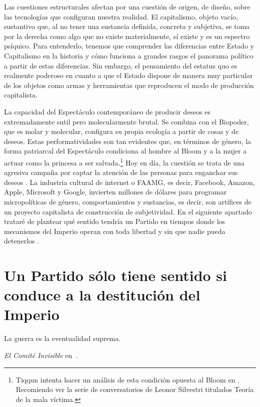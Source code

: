 Las cuestiones estructurales afectan por una cuestión de origen, de diseño, sobre las tecnologías que configuran nuestra realidad. El capitalismo, objeto vacío, sustantivo que, al no tener una sustancia definida, concreta y subjetiva, se toma por la derecha como algo que no existe materialmente, sí existe y es un espectro psíquico. Para entenderlo, tenemos que comprender las diferencias entre Estado y Capitalismo en la historia y cómo funciona a grandes rasgos el panorama político a partir de estas diferencias. Sin embargo, el pensamiento del estatus quo es realmente poderoso en cuanto a que el Estado dispone de manera muy particular de los objetos como armas y herramientas que reproducen el modo de producción capitalista.

La capacidad del Espectáculo contemporáneo de producir deseos es extremadamente sutil pero molecularmente brutal. Se combina con el Biopoder, que es molar y molecular, configura su propia ecología a partir de cosas y de deseos. Estas performatividades son tan evidentes que, en términos de género, la forma patriarcal del Espectáculo condiciona al hombre al Bloom y a la mujer a actuar como la princesa a ser salvada.\footnote{Tiqqun intenta hacer un análisis de esta condición opuesta al Bloom en \autocite{PrimerosMaterialesPara}. Recomiendo ver la serie de conversatorios de Leonor Silvestri titulados Teoría de la mala víctima.} Hoy en día, la cuestión se trata de una agresiva campaña por captar la atención de las personas para enganchar sus deseos \autocite{fernandez-savaterAusentarseCrisisAtencion, lanhamEconomicsAttentionStyle2007}. La industria cultural de internet o FAAMG, es decir, Facebook, Amazon, Apple, Microsoft y Google, invierten millones de dólares para programar micropolíticas de género, comportamientos y sustancias, es decir, son artífices de un proyecto capitalista de construcción de subjetividad. En el siguiente apartado trataré de plantear qué sentido tendría un Partido en tiempos donde los mecanismos del Imperio operan con toda libertad y sin que nadie pueda detenerlos \autocite[p.~52]{comiteinvisibleAhora2017}.

\section{Un Partido sólo tiene sentido si conduce a la destitución del Imperio}
\label{sec:un-partido-sólo-tiene-sentido-si}

\epigraph{La guerra es la eventualidad suprema.}{\emph{El Comité Invisible} en~\autocite{comiteinvisibleTeoriaBloom}.}

